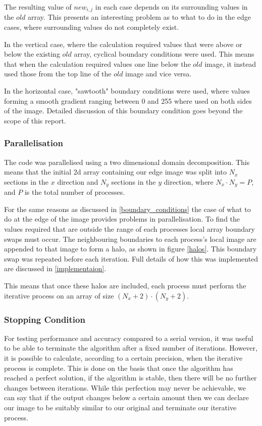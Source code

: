 \documentclass[a4paper,12pt]{article}
\begin{document}
The resulting value of $new_{i,j}$ in each case depends on its surrounding values in the $old$ array. This presents an interesting problem as to what to do in the edge cases, where surrounding values do not completely exist.

In the vertical case, where the calculation required values that were above or below the existing $old$ array, cyclical boundary conditions were used. This means that when the calculation required values one line below the $old$ image, it instead used those from the top line of the $old$ image and vice versa.

In the horizontal case, "sawtooth" boundary conditions were used, where values forming a smooth gradient ranging between 0 and 255 where used on both sides of the image. Detailed discussion of this boundary condition goes beyond the scope of this report. 

\subsubsection{Parallelisation}
\label{parallelisation}
The code was parallelised using a two dimensional domain decomposition. This means that the initial 2d array containing our edge image was split into $N_x$ sections in the $x$ direction and $N_y$ sections in the $y$ direction, where $N_x \cdot N_y = P$, and $P$ is the total number of processes. 

For the same reasons as discussed in \ref{boundary_conditions} the case of what to do at the edge of the image provides problems in parallelisation. To find the values required that are outside the range of each processes local array boundary swaps must occur. The neighbouring boundaries to each process's local image are appended to that image to form a halo, as shown in figure \ref{halos}. This boundary swap was repeated before each iteration. Full details of how this was implemented are discussed in \ref{implementaion}.

This means that once these halos are included, each process must perform the iterative process on an array of size $(N_x +2)\cdot(N_y+2)$.

\subsubsection{Stopping Condition}
\label{stop}
For testing performance and accuracy compared to a serial version, it was useful to be able to terminate the algorithm after a fixed number of iterations. However, it is possible to calculate, according to a certain precision, when the iterative process is complete. This is done on the basis that once the algorithm has reached a perfect solution, if the algorithm is stable, then there will be no further changes between iterations. While this perfection may never be achievable, we can say that if the output changes below a certain amount then we can declare our image to be suitably similar to our original and terminate our iterative process.
\end{document}
